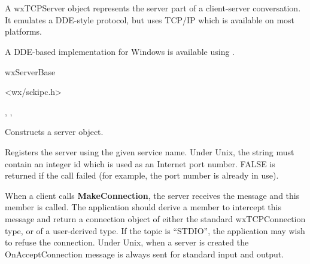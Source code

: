 \section{}\label{wxtcpserver}

A wxTCPServer object represents the server part of a client-server conversation.
It emulates a DDE-style protocol, but uses TCP/IP which is available on most platforms.

A DDE-based implementation for Windows is available using .


wxServerBase\\


<wx/sckipc.h>


, , 




Constructs a server object.



Registers the server using the given service name. Under Unix, the
string must contain an integer id which is used as an Internet port
number. FALSE is returned if the call failed (for example, the port
number is already in use).

\label{wxtcpserveronacceptconnection}


When a client calls {\bf MakeConnection}, the server receives the
message and this member is called. The application should derive a
member to intercept this message and return a connection object of
either the standard wxTCPConnection type, or of a user-derived type. If the
topic is ``STDIO'', the application may wish to refuse the connection.
Under Unix, when a server is created the OnAcceptConnection message is
always sent for standard input and output.

